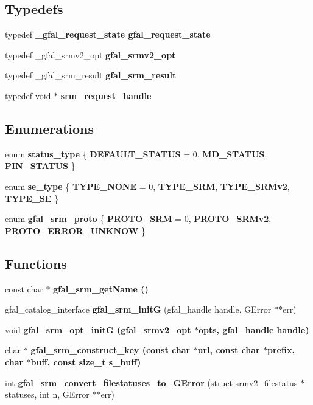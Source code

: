 \subsection*{Typedefs}
\begin{CompactItemize}
\item 
typedef \bf{\_\-gfal\_\-request\_\-state} \bf{gfal\_\-request\_\-state}
\item 
typedef \_\-gfal\_\-srmv2\_\-opt \textbf{gfal\_\-srmv2\_\-opt}\label{gfal__common__srm_8h_a3bcd91e6251d7f36da98c2145fa117b}

\item 
typedef \_\-gfal\_\-srm\_\-result \textbf{gfal\_\-srm\_\-result}\label{gfal__common__srm_8h_9098edc68db720cb1ae7849f51b5191b}

\item 
typedef void $\ast$ \textbf{srm\_\-request\_\-handle}\label{gfal__common__srm_8h_87f5a32879caba96e260c7e70c16888f}

\end{CompactItemize}
\subsection*{Enumerations}
\begin{CompactItemize}
\item 
enum \textbf{status\_\-type} \{ \textbf{DEFAULT\_\-STATUS} =  0, 
\textbf{MD\_\-STATUS}, 
\textbf{PIN\_\-STATUS}
 \}
\item 
enum \textbf{se\_\-type} \{ \textbf{TYPE\_\-NONE} =  0, 
\textbf{TYPE\_\-SRM}, 
\textbf{TYPE\_\-SRMv2}, 
\textbf{TYPE\_\-SE}
 \}
\item 
enum \textbf{gfal\_\-srm\_\-proto} \{ \textbf{PROTO\_\-SRM} = 0, 
\textbf{PROTO\_\-SRMv2}, 
\textbf{PROTO\_\-ERROR\_\-UNKNOW}
 \}
\end{CompactItemize}
\subsection*{Functions}
\begin{CompactItemize}
\item 
const char $\ast$ \bf{gfal\_\-srm\_\-get\-Name} ()
\item 
gfal\_\-catalog\_\-interface \textbf{gfal\_\-srm\_\-init\-G} (gfal\_\-handle handle, GError $\ast$$\ast$err)\label{gfal__common__srm_8h_0f8ff443c68a9f6177d717ad52b7d5a5}

\item 
void \bf{gfal\_\-srm\_\-opt\_\-init\-G} (gfal\_\-srmv2\_\-opt $\ast$opts, gfal\_\-handle handle)
\item 
char $\ast$ \bf{gfal\_\-srm\_\-construct\_\-key} (const char $\ast$url, const char $\ast$prefix, char $\ast$buff, const size\_\-t s\_\-buff)
\item 
int \textbf{gfal\_\-srm\_\-convert\_\-filestatuses\_\-to\_\-GError} (struct srmv2\_\-filestatus $\ast$statuses, int n, GError $\ast$$\ast$err)\label{gfal__common__srm_8h_9177e8f96da30fda27c71daead3ff4e8}

\end{CompactItemize}


